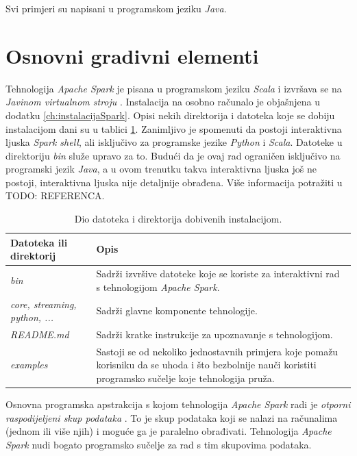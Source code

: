 \documentclass[times, utf8, zavrsni]{fer}
\begin{document}
Svi primjeri su napisani u programskom jeziku \emph{Java}.

\section{Osnovni gradivni elementi}
Tehnologija \emph{Apache Spark} je pisana u programskom jeziku \emph{Scala} i izvršava se na \emph{Javinom virtualnom stroju} . Instalacija na osobno računalo je objašnjena u dodatku \ref{ch:instalacijaSpark}. Opisi nekih direktorija i datoteka koje se dobiju instalacijom dani su u tablici \ref{tbl:installPackage}. Zanimljivo je spomenuti da postoji interaktivna ljuska \emph{Spark shell}, ali isključivo za programske jezike \emph{Python} i \emph{Scala}. Datoteke u direktoriju \emph{bin} služe upravo za to. Budući da je ovaj rad ograničen isključivo na programski jezik \emph{Java}, a u ovom trenutku takva interaktivna ljuska još ne postoji, interaktivna ljuska nije detaljnije obrađena. Više informacija potražiti u TODO: REFERENCA.

\begin{table}[htb]
\caption{Dio datoteka i direktorija dobivenih instalacijom.}
\label{tbl:installPackage}
\centering
\begin{tabular}{l p{8cm}}
\hline
Datoteka ili direktorij & Opis \\
\hline
\emph{bin} & Sadrži izvršive datoteke koje se koriste za interaktivni rad s tehnologijom \emph{Apache Spark}.\\
\emph{core, streaming, python, ...} & Sadrži glavne komponente tehnologije. \\
\emph{README.md} & Sadrži kratke instrukcije za upoznavanje s tehnologijom.\\
\emph{examples} & Sastoji se od nekoliko jednostavnih primjera koje pomažu korisniku da se uhoda i što bezbolnije nauči koristiti programsko sučelje koje tehnologija pruža. \\
\hline
\end{tabular}
\end{table}

Osnovna programska apstrakcija s kojom tehnologija \emph{Apache Spark} radi je \emph{otporni raspodijeljeni skup podataka} . To je skup podataka koji se nalazi na računalima (jednom ili više njih) i moguće ga je paralelno obrađivati. Tehnologija \emph{Apache Spark} nudi bogato programsko sučelje za rad s tim skupovima podataka.
\end{document}
